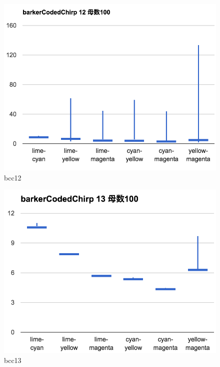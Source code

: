 \begin{figure}[p]
  \centering
  \includegraphics[clip,width=1.05\hsize]{img/bcc12.png}
  \caption{bcc12}\label{fig:bcc12}
\end{figure}

\begin{figure}[p]
  \centering
  \includegraphics[clip,width=1.05\hsize]{img/bcc13.png}
  \caption{bcc13}\label{fig:bcc13}
\end{figure}

